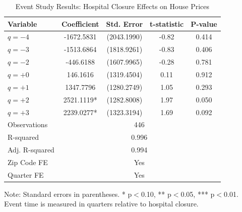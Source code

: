 \begin{table}[htbp]
\centering
\caption{Event Study Results: Hospital Closure Effects on House Prices}
\label{tab:event_study}
\begin{tabular}{lcccc}
\hline\hline
Variable & Coefficient & Std. Error & t-statistic & P-value \\
\hline
$q = -4$ & -1672.5831 & (2043.1990) & -0.82 & 0.414 \\
$q = -3$ & -1513.6864 & (1818.9261) & -0.83 & 0.406 \\
$q = -2$ & -446.6188 & (1607.9965) & -0.28 & 0.781 \\
$q = +0$ & 146.1616 & (1319.4504) & 0.11 & 0.912 \\
$q = +1$ & 1347.7796 & (1280.2749) & 1.05 & 0.293 \\
$q = +2$ & 2521.1119* & (1282.8008) & 1.97 & 0.050 \\
$q = +3$ & 2239.0277* & (1323.3194) & 1.69 & 0.092 \\
\hline
Observations & \multicolumn{4}{c}{446} \\
R-squared & \multicolumn{4}{c}{0.996} \\
Adj. R-squared & \multicolumn{4}{c}{0.994} \\
Zip Code FE & \multicolumn{4}{c}{Yes} \\
Quarter FE & \multicolumn{4}{c}{Yes} \\
\hline\hline
\end{tabular}
\begin{tablenotes}
\small
\item Note: Standard errors in parentheses. * p$<$0.10, ** p$<$0.05, *** p$<$0.01. Event time is measured in quarters relative to hospital closure.
\end{tablenotes}
\end{table}
